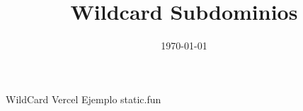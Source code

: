 \documentclass[a4paper]{article}
\title{Wildcard Subdominios}
\date{\today}
\begin{document}
    \maketitle
    \tableofcontents
    \paragraph{}
    WildCard Vercel Ejemplo static.fun
\end{document}
